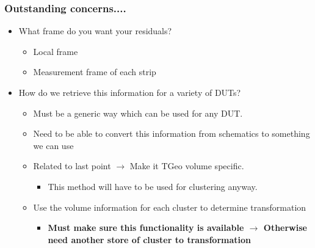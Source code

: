 \documentclass{beamer}
\begin{document}
\begin{frame}
\frametitle{Outstanding concerns....}
\begin{itemize}
\item What frame do you want your residuals?
\begin{itemize}
\item Local frame
\item Measurement frame of each strip
\end{itemize}
\item How do we retrieve this information for a variety of DUTs?
\begin{itemize}
\item Must be a generic way which can be used for any DUT.
\item Need to be able to convert this information from schematics to something we can use
\item Related to last point $\rightarrow$ Make it TGeo volume specific.
\begin{itemize}
\item This method will have to be used for clustering anyway.
\end{itemize}
\item Use the volume information for each cluster to determine transformation
\begin{itemize}
\item \textbf{Must make sure this functionality is available $\rightarrow$ Otherwise need another store of cluster to transformation}
\end{itemize} 
\end{itemize}
\end{itemize}

\end{frame}
\end{document}
